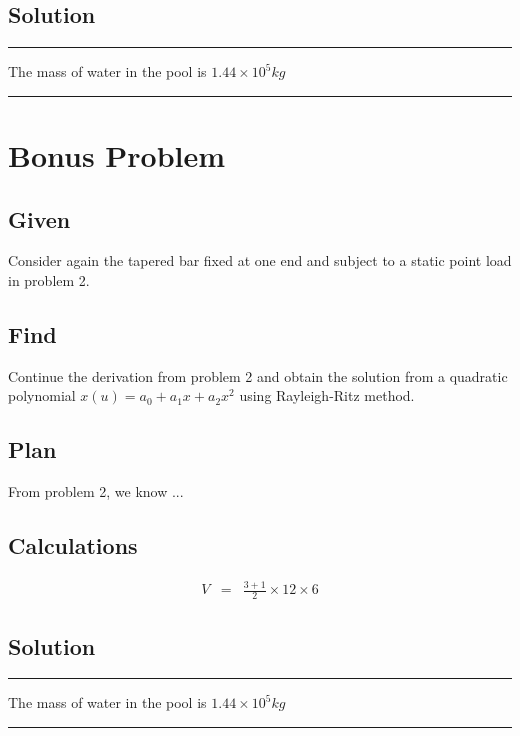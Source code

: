 \documentclass[a4paper]{memoir}
\begin{document}
\subsection{Solution}
\begin{minipage}{300pt}
	\begin{center}{
		\begin{shaded}
			\hrule
			\vspace{20pt}
			The mass of water in the pool is $1.44 \times 10^5 kg$  %
			\vspace{16pt}
			\hrule
		\end{shaded}
	}
	\end{center}
\end{minipage}

\section{Bonus Problem}
\subsection{Given}
Consider again the tapered bar fixed at one end and subject to a static point load in problem 2.

\subsection{Find}
Continue the derivation from problem 2 and obtain the solution from a quadratic polynomial $x(u) = a_0+a_1x+a_2x^2$ using Rayleigh-Ritz method.

\subsection{Plan}
From problem 2, we know ...

\subsection{Calculations}
\begin{eqnarray*}
V &=& \frac{3+1}{2} \times 12 \times 6
\end{eqnarray*}

\subsection{Solution}
\begin{minipage}{300pt}
	\begin{center}{
		\begin{shaded}
			\hrule
			\vspace{20pt}
			The mass of water in the pool is $1.44 \times 10^5 kg$  %
			\vspace{16pt}
			\hrule
		\end{shaded}
	}
	\end{center}
\end{minipage}
\end{document}
